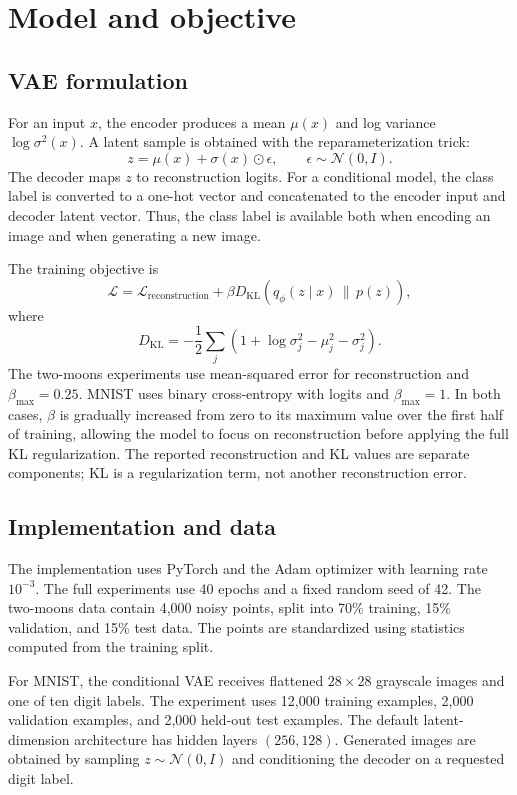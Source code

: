 \documentclass[11pt]{article}
\begin{document}
\section{Model and objective}

\subsection{VAE formulation}

For an input $x$, the encoder produces a mean $\mu(x)$ and log variance
$\log \sigma^2(x)$. A latent sample is obtained with the reparameterization
trick:
\[
    z = \mu(x) + \sigma(x) \odot \epsilon,
    \qquad \epsilon \sim \mathcal{N}(0,I).
\]
The decoder maps $z$ to reconstruction logits. For a conditional model, the
class label is converted to a one-hot vector and concatenated to the encoder
input and decoder latent vector. Thus, the class label is available both when
encoding an image and when generating a new image.

The training objective is
\[
    \mathcal{L}
    =
    \mathcal{L}_{\mathrm{reconstruction}}
    +
    \beta D_{\mathrm{KL}}\left(q_\phi(z\mid x)\,\|\,p(z)\right),
\]
where
\[
    D_{\mathrm{KL}}
    =
    -\frac{1}{2}\sum_j
    \left(1+\log\sigma_j^2-\mu_j^2-\sigma_j^2\right).
\]
The two-moons experiments use mean-squared error for reconstruction and
$\beta_{\max}=0.25$. MNIST uses binary cross-entropy with logits and
$\beta_{\max}=1$. In both cases, $\beta$ is gradually increased from zero to its maximum value over the first half of training, allowing the model to focus on reconstruction before applying the full KL regularization. The reported reconstruction and KL values are separate components;
KL is a regularization term, not another reconstruction error.

\subsection{Implementation and data}

The implementation uses PyTorch and the Adam optimizer with learning rate
$10^{-3}$. The full experiments use 40 epochs and a fixed random seed of 42.
The two-moons data contain 4,000 noisy points, split into 70\% training,
15\% validation, and 15\% test data. The points are standardized using
statistics computed from the training split.

For MNIST, the conditional VAE receives flattened $28\times28$ grayscale
images and one of ten digit labels. The experiment uses 12,000 training
examples, 2,000 validation examples, and 2,000 held-out test examples.
The default latent-dimension architecture has hidden layers $(256,128)$.
Generated images are obtained by sampling $z\sim\mathcal{N}(0,I)$ and
conditioning the decoder on a requested digit label.
\end{document}
